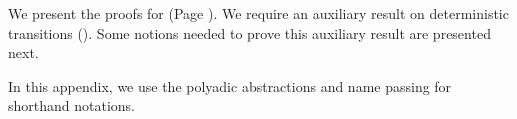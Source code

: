 We present the proofs for 
 (Page \pageref{the:coincidence}).
We require an auxiliary result on 
deterministic transitions ().
Some notions needed to prove this auxiliary result are presented next.


%			
%
In this appendix, we use the polyadic abstractions and name passing 
for shorthand notations. 






